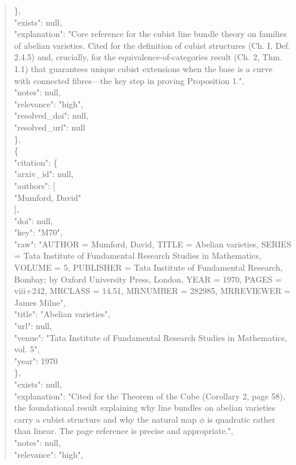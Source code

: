\documentclass[11pt]{article}
\begin{document}
\begin{quote}
      \},\\
      "exists": null,\\
      "explanation": "Core reference for the cubist line bundle theory on families of abelian varieties. Cited for the definition of cubist structures (Ch. I, Def. 2.4.5) and, crucially, for the equivalence-of-categories result (Ch. 2, Thm. 1.1) that guarantees unique cubist extensions when the base is a curve with connected fibres---the key step in proving Proposition 1.",\\
      "notes": null,\\
      "relevance": "high",\\
      "resolved\_doi": null,\\
      "resolved\_url": null\\
    \},\\
    \{\\
      "citation": \{\\
        "arxiv\_id": null,\\
        "authors": [\\
          "Mumford, David"\\
        ],\\
        "doi": null,\\
        "key": "M70",\\
        "raw": "AUTHOR = Mumford, David, TITLE = Abelian varieties, SERIES = Tata Institute of Fundamental Research Studies in Mathematics, VOLUME = 5, PUBLISHER = Tata Institute of Fundamental Research, Bombay; by Oxford University Press, London, YEAR = 1970, PAGES = viii+242, MRCLASS = 14.51, MRNUMBER = 282985, MRREVIEWER = James Milne",\\
        "title": "Abelian varieties",\\
        "url": null,\\
        "venue": "Tata Institute of Fundamental Research Studies in Mathematics, vol. 5",\\
        "year": 1970\\
      \},\\
      "exists": null,\\
      "explanation": "Cited for the Theorem of the Cube (Corollary 2, page 58), the foundational result explaining why line bundles on abelian varieties carry a cubist structure and why the natural map \ensuremath{\phi} is quadratic rather than linear. The page reference is precise and appropriate.",\\
      "notes": null,\\
      "relevance": "high",\\

\end{quote}
\end{document}
